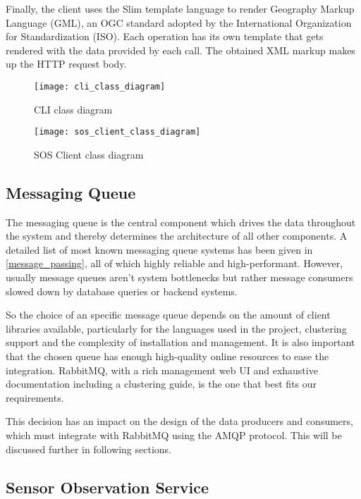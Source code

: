 Finally, the client uses the Slim template language to render Geography Markup Language (GML), an OGC standard adopted by the International Organization for Standardization (ISO). Each operation has its own template that gets rendered with the data provided by each call. The obtained XML markup makes up the HTTP request body.

\begin{sidewaysfigure}
	\texttt{[image: cli\_class\_diagram]}
	\caption{CLI class diagram}
	\label{fig:cli_class_diagram}
\end{sidewaysfigure}

\begin{sidewaysfigure}
	\texttt{[image: sos\_client\_class\_diagram]}
	\caption{SOS Client class diagram}
	\label{fig:sos_client_class_diagram}
\end{sidewaysfigure}

\subsection{Messaging Queue}

The messaging queue is the central component which drives the data throughout the system and thereby determines the architecture of all other components. A detailed list of most known messaging queue systems has been given in \ref{message_passing}, all of which highly reliable and high-performant. However, usually message queues aren't system bottlenecks but rather message consumers slowed down by database queries or backend systems.

So the choice of an specific message queue depends on the amount of client libraries available, particularly for the languages used in the project, clustering support and the complexity of installation and management. It is also important that the chosen queue has enough high-quality online resources to ease the integration. RabbitMQ, with a rich management web UI and exhaustive documentation including a clustering guide, is the one that best fits our requirements.

This decision has an impact on the design of the data producers and consumers, which must integrate with RabbitMQ using the AMQP protocol. This will be discussed further in following sections.

\subsection{Sensor Observation Service}

